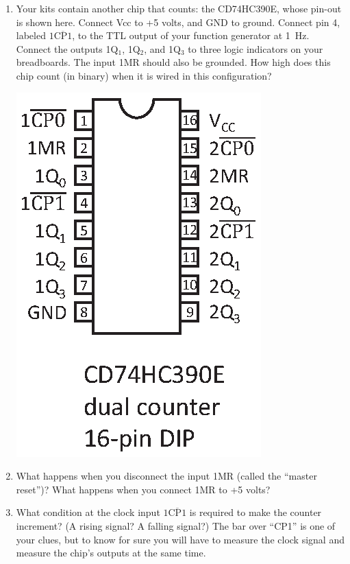 \begin{enumerate}
\item Your kits contain another chip that counts: the CD74HC390E, whose pin-out is shown here.  Connect Vcc to +5 volts, and GND to ground.  Connect pin 4, labeled $1\mathrm{\overline{CP1}}$, to the TTL output of your function generator at 1~Hz.  Connect the outputs 1Q$_1$, 1Q$_2$, and 1Q$_3$ to three logic indicators on your breadboards.  The input 1MR should also be grounded.  How high does this chip count (in binary) when it is wired in this configuration?  

\vspace{-0.2in}
\begin{center}
\includegraphics[scale=0.8]{appendices/pinouts/cd74hc390e.eps}
\end{center}
\vspace{-0.1in}

\item What happens when you disconnect the input 1MR (called the ``master reset'')?  What happens when you connect 1MR to +5 volts?

\item What condition at the clock input $1\mathrm{\overline{CP1}}$ is required to make the counter increment?  (A rising signal?  A falling signal?)  The bar over ``CP1'' is one of your clues, but to know for sure you will have to measure the clock signal and measure the chip's outputs at the same time.


\end{enumerate}
